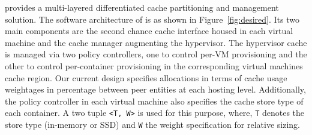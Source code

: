\dd{} provides a 
multi-layered differentiated cache partitioning and management solution.
%
The software architecture of \dd{} is as shown in Figure~\ref{fig:desired}.
Its two main components are the second chance cache interface housed
in each virtual machine and the \dd{} cache manager augmenting the 
hypervisor.
%
The hypervisor cache is managed via two policy controllers,
one to control per-VM provisioning and the other
to control per-container provisioning in the corresponding
virtual machines cache region.
%
Our current design specifies allocations in terms of cache 
usage weightages in percentage between peer entities at 
each hosting level. 
%
Additionally, the policy controller in each virtual machine
also specifies the cache store type of each container.
%
A two tuple \texttt{<T, W>} is used for this purpose,
where, \texttt{T} denotes the store type (in-memory or SSD)
and \texttt{W} the weight specification for relative sizing.
%
%
%

